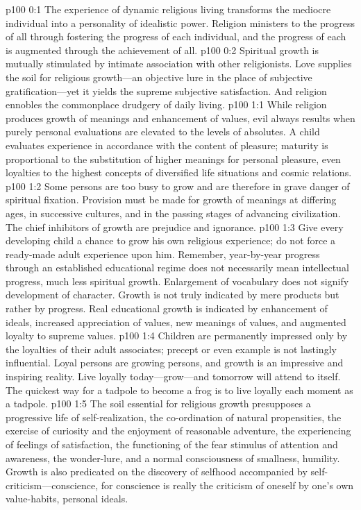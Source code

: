 \author{Melchizedek}
\vs p100 0:1 The experience of dynamic religious living transforms the mediocre individual into a personality of idealistic power. Religion ministers to the progress of all through fostering the progress of each individual, and the progress of each is augmented through the achievement of all.
\vs p100 0:2 Spiritual growth is mutually stimulated by intimate association with other religionists. Love supplies the soil for religious growth---an objective lure in the place of subjective gratification---yet it yields the supreme subjective satisfaction. And religion ennobles the commonplace drudgery of daily living.
\vs p100 1:1 While religion produces growth of meanings and enhancement of values, evil always results when purely personal evaluations are elevated to the levels of absolutes. A child evaluates experience in accordance with the content of pleasure; maturity is proportional to the substitution of higher meanings for personal pleasure, even loyalties to the highest concepts of diversified life situations and cosmic relations.
\vs p100 1:2 Some persons are too busy to grow and are therefore in grave danger of spiritual fixation. Provision must be made for growth of meanings at differing ages, in successive cultures, and in the passing stages of advancing civilization. The chief inhibitors of growth are prejudice and ignorance.
\vs p100 1:3 Give every developing child a chance to grow his own religious experience; do not force a ready\hyp{}made adult experience upon him. Remember, year\hyp{}by\hyp{}year progress through an established educational regime does not necessarily mean intellectual progress, much less spiritual growth. Enlargement of vocabulary does not signify development of character. Growth is not truly indicated by mere products but rather by progress. Real educational growth is indicated by enhancement of ideals, increased appreciation of values, new meanings of values, and augmented loyalty to supreme values.
\vs p100 1:4 Children are permanently impressed only by the loyalties of their adult associates; precept or even example is not lastingly influential. Loyal persons are growing persons, and growth is an impressive and inspiring reality. Live loyally today---grow---and tomorrow will attend to itself. The quickest way for a tadpole to become a frog is to live loyally each moment as a tadpole.
\pc \vs p100 1:5 The soil essential for religious growth presupposes a progressive life of self\hyp{}realization, the co\hyp{}ordination of natural propensities, the exercise of curiosity and the enjoyment of reasonable adventure, the experiencing of feelings of satisfaction, the functioning of the fear stimulus of attention and awareness, the wonder\hyp{}lure, and a normal consciousness of smallness, humility. Growth is also predicated on the discovery of selfhood accompanied by self\hyp{}criticism---conscience, for conscience is really the criticism of oneself by one’s own value\hyp{}habits, personal ideals.
